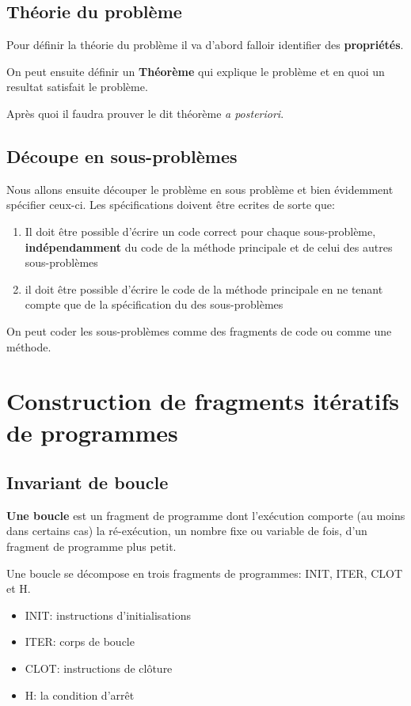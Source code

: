 \documentclass[11pt, a4paper]{article}
\begin{document}
\subsection{Théorie du problème}

Pour définir la théorie du problème il va d'abord falloir identifier des \textbf{propriétés}. 

On peut ensuite définir un \textbf{Théorème} qui explique le problème et en quoi un resultat satisfait le problème.

Après quoi il faudra prouver le dit théorème \textit{a posteriori}.

\subsection{Découpe en sous-problèmes}

Nous allons ensuite découper le problème en sous problème et bien évidemment spécifier ceux-ci. Les spécifications doivent être ecrites de sorte que:
\begin{enumerate}
\item Il doit être possible d'écrire un code correct pour chaque sous-problème, \textbf{indépendamment} du code de la méthode principale et de celui des autres sous-problèmes
\item il doit être possible d'écrire le code de la méthode principale en ne tenant compte que de la spécification du des sous-problèmes
\end{enumerate}

On peut coder les sous-problèmes comme des fragments de code ou comme une méthode. 

\section{Construction de fragments itératifs de programmes}

\subsection{Invariant de boucle}

\textbf{Une boucle} est un fragment de programme dont l'exécution comporte (au moins dans certains cas) la ré-exécution, un nombre fixe ou variable de fois, d'un fragment de programme plus petit.

Une boucle se décompose en trois fragments de programmes: \textsc{INIT}, \textsc{ITER},  \textsc{CLOT} et \textsc{H}.
\begin{itemize}
	\item \textsc{INIT}: instructions d'initialisations
	\item \textsc{ITER}: corps de boucle
	\item \textsc{CLOT}: instructions de clôture
	\item \textsc{H}: la condition d'arrêt
\end{itemize}
\end{document}
